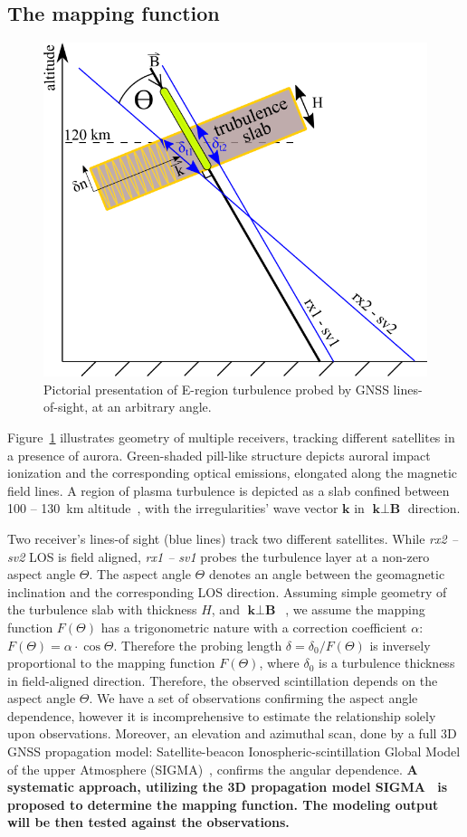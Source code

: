 \documentclass[letterpaper,12pt]{article}
\begin{document}
\vspace{-0.5em}\subsection{The mapping function}

\begin{figure}
\centering
\includegraphics[width=.48\textwidth]{fig/turbulence}
\caption{Pictorial presentation of E-region turbulence probed by GNSS lines-of-sight, at an arbitrary angle.}
\label{fig:turbulence}
\end{figure}

Figure~\ref{fig:turbulence} illustrates geometry of multiple receivers, tracking different satellites in a presence of aurora. Green-shaded pill-like structure depicts auroral impact ionization and the corresponding optical emissions, elongated along the magnetic field lines. A region of plasma turbulence is depicted as a slab confined between 100 -- 130~km altitude~\citep{Dimant2011b}, with the irregularities' wave vector $\textbf{k}$ in $\textbf{k} \perp \textbf{B}$ direction.  

Two receiver's lines-of sight (blue lines) track two different satellites. While \textit{rx2 -- sv2} LOS is field aligned, \textit{rx1 -- sv1} probes the turbulence layer at a non-zero aspect angle $\Theta$. The aspect angle $\Theta$ denotes an angle between the geomagnetic inclination and the corresponding LOS direction. Assuming simple geometry of the turbulence slab with thickness $H$, and $\textbf{k} \perp \textbf{B}$~\citep{Chartier2016}, we assume the mapping function $F(\Theta)$ has a trigonometric nature with a correction coefficient $\alpha$: $F(\Theta)=\alpha \cdot \cos \Theta$. Therefore the probing length $\delta=\delta_0 / F(\Theta)$ is inversely proportional to the mapping function $F(\Theta)$, where $\delta_0$ is a turbulence thickness in field-aligned direction. Therefore, the observed scintillation depends on the aspect angle $\Theta$. We have a set of observations confirming the aspect angle dependence, however it is incomprehensive to estimate the relationship solely upon observations. Moreover, an elevation and azimuthal scan, done by a full 3D GNSS propagation model: Satellite-beacon Ionospheric-scintillation Global Model of the upper Atmosphere (SIGMA)~\citep{Key2014}, confirms the angular dependence. \textbf{A systematic approach, utilizing the 3D propagation model SIGMA~\citep{Key2014} is proposed to determine the mapping function. The modeling output will be then tested against the observations.}
\end{document}
